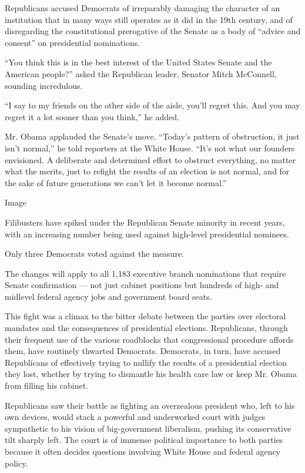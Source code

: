 Republicans accused Democrats of irreparably damaging the character of
an institution that in many ways still operates as it did in the 19th
century, and of disregarding the constitutional prerogative of the
Senate as a body of ``advice and consent'' on presidential nominations.

``You think this is in the best interest of the United States Senate and
the American people?'' asked the Republican leader, Senator Mitch
McConnell, sounding incredulous.

``I say to my friends on the other side of the aisle, you'll regret
this. And you may regret it a lot sooner than you think,'' he added.

Mr. Obama applauded the Senate's move. ``Today's pattern of obstruction,
it just isn't normal,'' he told reporters at the White House. ``It's not
what our founders envisioned. A deliberate and determined effort to
obstruct everything, no matter what the merits, just to refight the
results of an election is not normal, and for the sake of future
generations we can't let it become normal.''

Image

Filibusters have spiked under the Republican Senate minority in recent
years, with an increasing number being used against high-level
presidential nominees.

Only three Democrats voted against the measure.

The changes will apply to all 1,183 executive branch nominations that
require Senate confirmation --- not just cabinet positions but hundreds
of high- and midlevel federal agency jobs and government board seats.

This fight was a climax to the bitter debate between the parties over
electoral mandates and the consequences of presidential elections.
Republicans, through their frequent use of the various roadblocks that
congressional procedure affords them, have routinely thwarted Democrats.
Democrats, in turn, have accused Republicans of effectively trying to
nullify the results of a presidential election they lost, whether by
trying to dismantle his health care law or keep Mr. Obama from filling
his cabinet.

Republicans saw their battle as fighting an overzealous president who,
left to his own devices, would stack a powerful and underworked court
with judges sympathetic to his vision of big-government liberalism,
pushing its conservative tilt sharply left. The court is of immense
political importance to both parties because it often decides questions
involving White House and federal agency policy.

